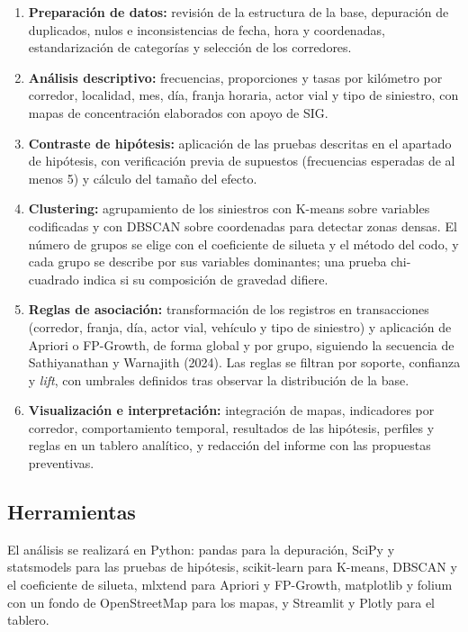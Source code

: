 \documentclass[12pt,letterpaper]{article}
\providecommand{\tightlist}{\setlength{\itemsep}{2pt}\setlength{\parskip}{0pt}}
\begin{document}
\begin{enumerate}
\def\labelenumi{\arabic{enumi}.}
\tightlist
\item
  \textbf{Preparación de datos:} revisión de la estructura de la base,
  depuración de duplicados, nulos e inconsistencias de fecha, hora y
  coordenadas, estandarización de categorías y selección de los
  corredores.
\item
  \textbf{Análisis descriptivo:} frecuencias, proporciones y tasas por
  kilómetro por corredor, localidad, mes, día, franja horaria, actor
  vial y tipo de siniestro, con mapas de concentración elaborados con
  apoyo de SIG.
\item
  \textbf{Contraste de hipótesis:} aplicación de las pruebas descritas
  en el apartado de hipótesis, con verificación previa de supuestos (frecuencias
  esperadas de al menos 5) y cálculo del tamaño del efecto.
\item
  \textbf{Clustering:} agrupamiento de los siniestros con K-means sobre
  variables codificadas y con DBSCAN sobre coordenadas para detectar
  zonas densas. El número de grupos se elige con el coeficiente de
  silueta y el método del codo, y cada grupo se describe por sus
  variables dominantes; una prueba chi-cuadrado indica si su composición
  de gravedad difiere.
\item
  \textbf{Reglas de asociación:} transformación de los registros en
  transacciones (corredor, franja, día, actor vial, vehículo y tipo de
  siniestro) y aplicación de Apriori o FP-Growth, de forma global y por
  grupo, siguiendo la secuencia de Sathiyanathan y Warnajith (2024). Las
  reglas se filtran por soporte, confianza y \emph{lift}, con umbrales
  definidos tras observar la distribución de la base.
\item
  \textbf{Visualización e interpretación:} integración de mapas,
  indicadores por corredor, comportamiento temporal, resultados de las
  hipótesis, perfiles y reglas en un tablero analítico, y redacción del
  informe con las propuestas preventivas.
\end{enumerate}

\hypertarget{herramientas}{%
\subsection{Herramientas}\label{herramientas}}

El análisis se realizará en Python: pandas para la depuración, SciPy y
statsmodels para las pruebas de hipótesis, scikit-learn para K-means,
DBSCAN y el coeficiente de silueta, mlxtend para Apriori y FP-Growth,
matplotlib y folium con un fondo de OpenStreetMap para los mapas, y
Streamlit y Plotly para el tablero.
\end{document}
